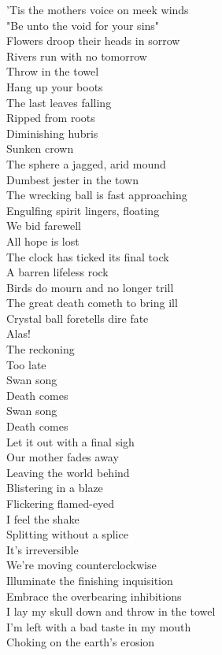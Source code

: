 'Tis the mothers voice on meek winds \\
"Be unto the void for your sins" \\
Flowers droop their heads in sorrow \\
Rivers run with no tomorrow \\

Throw in the towel \\
Hang up your boots \\
The last leaves falling \\
Ripped from roots \\
Diminishing hubris \\
Sunken crown \\
The sphere a jagged, arid mound \\
Dumbest jester in the town \\
The wrecking ball is fast approaching \\
Engulfing spirit lingers, floating \\
We bid farewell \\
All hope is lost \\
The clock has ticked its final tock \\
A barren lifeless rock \\

Birds do mourn and no longer trill \\
The great death cometh to bring ill \\
Crystal ball foretells dire fate \\
Alas! \\
The reckoning \\
Too late \\

Swan song \\
Death comes \\
Swan song \\
Death comes \\

Let it out with a final sigh \\
Our mother fades away \\
Leaving the world behind \\
Blistering in a blaze \\
Flickering flamed-eyed \\
I feel the  shake \\
Splitting without a splice \\
It's irreversible \\
We're moving counterclockwise \\
Illuminate the finishing inquisition \\
Embrace the overbearing inhibitions \\
I lay my skull down and throw in the towel \\
I'm left with a bad taste in my mouth \\
Choking on the earth's erosion \\

